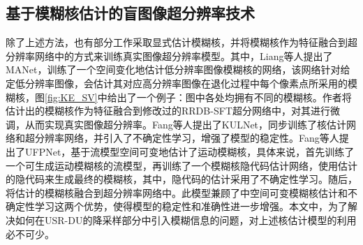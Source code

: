 \subsection{基于模糊核估计的盲图像超分辨率技术}
除了上述方法，也有部分工作采取显式估计模糊核，并将模糊核作为特征融合到超分辨率网络中的方式来训练真实图像超分辨率模型。其中，Liang等人\cite{liang2021mutual}提出了MANet，训练了一个空间变化地估计低分辨率图像模糊核的网络，该网络针对给定低分辨率图像，会估计其对应高分辨率图像在退化过程中每个像素点所采用的模糊核，图\ref{fig:KE_SV}中给出了一个例子：图中各处均拥有不同的模糊核。作者将估计出的模糊核作为特征融合到修改过的RRDB-SFT超分网络中，对其进行微调，从而实现真实图像超分辨率。Fang等人\cite{fang2022uncertainty}提出了KULNet，同步训练了核估计网络和超分辨率网络，并引入了不确定性学习，增强了模型的稳定性。Fang等人\cite{fangself}提出了UFPNet，基于流模型空间可变地估计了运动模糊核，具体来说，首先训练了一个可生成运动模糊核的流模型，再训练了一个模糊核隐代码估计网络，使用估计的隐代码来生成最终的模糊核，其中，隐代码的估计采用了不确定性学习。随后，将估计的模糊核融合到超分辨率网络中。此模型兼顾了\cite{liang2021mutual}\cite{fang2022uncertainty}中空间可变模糊核估计和不确定性学习这两个优势，使得模型的稳定性和准确性进一步增强。本文中，为了解决如何在USR-DU的降采样部分中引入模糊信息的问题，对上述核估计模型的利用必不可少。


\begin{figure}[htbp]
    \centering
    \hfill
\end{figure} 



